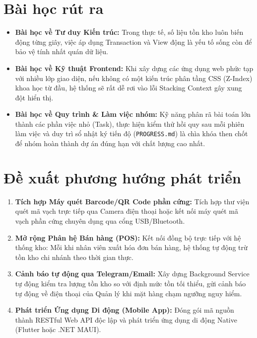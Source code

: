 \documentclass[12pt,a4paper]{report}
\renewcommand{\_}{\textunderscore\allowbreak}
\begin{document}
\section{Bài học rút ra}
\begin{itemize}
    \item \textbf{Bài học về Tư duy Kiến trúc:} Trong thực tế, số liệu tồn kho luôn biến động từng giây, việc áp dụng Transaction và View động là yếu tố sống còn để bảo vệ tính nhất quán dữ liệu.
    \item \textbf{Bài học về Kỹ thuật Frontend:} Khi xây dựng các ứng dụng web phức tạp với nhiều lớp giao diện, nếu không có một kiến trúc phân tầng CSS (Z-Index) khoa học từ đầu, hệ thống sẽ rất dễ rơi vào lỗi Stacking Context gây xung đột hiển thị.
    \item \textbf{Bài học về Quy trình \& Làm việc nhóm:} Kỹ năng phân rã bài toán lớn thành các phần việc nhỏ (Task), thực hiện kiểm thử hồi quy sau mỗi phiên làm việc và duy trì sổ nhật ký tiến độ (\texttt{PROGRESS.md}) là chìa khóa then chốt để nhóm hoàn thành dự án đúng hạn với chất lượng cao nhất.
\end{itemize}

\section{Đề xuất phương hướng phát triển}
\begin{enumerate}
    \item \textbf{Tích hợp Máy quét Barcode/QR Code phần cứng:} Tích hợp thư viện quét mã vạch trực tiếp qua Camera điện thoại hoặc kết nối máy quét mã vạch phần cứng chuyên dụng qua cổng USB/Bluetooth.
    \item \textbf{Mở rộng Phân hệ Bán hàng (POS):} Kết nối đồng bộ trực tiếp với hệ thống kho: Mỗi khi nhân viên xuất hóa đơn bán hàng, hệ thống tự động trừ tồn kho chi nhánh theo thời gian thực.
    \item \textbf{Cảnh báo tự động qua Telegram/Email:} Xây dựng Background Service tự động kiểm tra lượng tồn kho so với định mức tồn tối thiểu, gửi cảnh báo tự động về điện thoại của Quản lý khi mặt hàng chạm ngưỡng nguy hiểm.
    \item \textbf{Phát triển Ứng dụng Di động (Mobile App):} Đóng gói mã nguồn thành RESTful Web API độc lập và phát triển ứng dụng di động Native (Flutter hoặc .NET MAUI).
\end{enumerate}

\cleardoublepage

\end{document}
